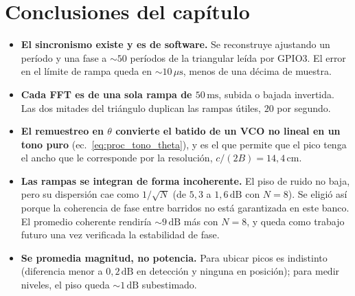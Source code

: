 \section{Conclusiones del capítulo}
\label{sec:proc_conclusiones}

\begin{itemize}
  \item \textbf{El sincronismo existe y es de software.} Se reconstruye
    ajustando un período y una fase a $\sim 50$ períodos de la triangular
    leída por GPIO3. El error en el límite de rampa queda en
    $\sim 10\,\mu\text{s}$, menos de una décima de muestra.
  \item \textbf{Cada FFT es de una sola rampa de $50\,\text{ms}$}, subida o
    bajada invertida. Las dos mitades del triángulo duplican las rampas
    útiles, $20$ por segundo.
  \item \textbf{El remuestreo en $\theta$ convierte el batido de un VCO no
    lineal en un tono puro} (ec.~\eqref{eq:proc_tono_theta}), y es el que
    permite que el pico tenga el ancho que le corresponde por la
    resolución, $c/(2B) = 14{,}4\,\text{cm}$.
  \item \textbf{Las rampas se integran de forma incoherente.} El piso de
    ruido no baja, pero su dispersión cae como $1/\sqrt N$ (de $5{,}3$ a
    $1{,}6\,\text{dB}$ con $N = 8$). Se eligió así porque la coherencia de
    fase entre barridos no está garantizada en este banco. El promedio
    coherente rendiría $\sim 9\,\text{dB}$ más con $N = 8$, y queda como
    trabajo futuro una vez verificada la estabilidad de fase.
  \item \textbf{Se promedia magnitud, no potencia.} Para ubicar picos es
    indistinto (diferencia menor a $0{,}2\,\text{dB}$ en detección y
    ninguna en posición); para medir niveles, el piso queda
    $\sim 1\,\text{dB}$ subestimado.
\end{itemize}
